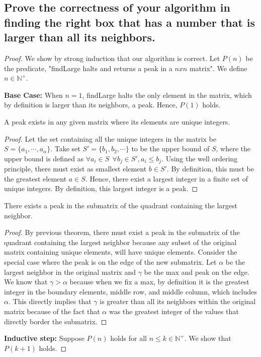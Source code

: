 \documentclass[11pt]{scrartcl}
\begin{document}
\subsection{
	Prove the correctness of your algorithm in finding the right box that has a number
	that is larger than all its neighbors.
}
\begin{proof}
	We show by strong induction that our algorithm is correct. Let $P(n)$ be the predicate,
	"findLarge halts and returns a peak in a $nxn$ matrix".
	We define $n \in \mathbb{N^{+}}$.
	\par \textbf{Base Case:} When $n = 1$, findLarge halts the only element in the matrix, which by definition
	is larger than its neighbors, a peak. Hence, $P(1)$ holds.
	\begin{theorem*}
		A peak exists in any given matrix where its elements are unique integers.
		\begin{proof}
			Let the set
			containing all the unique integers in the matrix be $S = \{a_1, \cdots, a_\alpha\}$.
			Take set $S' = \{b_1, b_2, \cdots\}$ to be the upper bound of $S$,
			where the upper bound is defined as $ \forall a_i \in S \ \ \forall b_j \in S', a_i \leq b_j$.
			Using the well ordering principle, there must exist as smallest element $b \in S'$.
			By definition, this must be the greatest element $a \in S$.
			Hence, there exist a largest integer in a finite set of unique integers.
			By definition, this largest integer is a peak.
		\end{proof}
	\end{theorem*}
	\begin{corollary*}
		There exists a peak in the submatrix of the quadrant containing the largest neighbor.
		\begin{proof}
			By previous theorem, there must exist a peak in the submatrix of the quadrant containing the largest neighbor
			because any subset of the original matrix containing unique elements, will have unique elements. Consider the
			special case where the peak is on the edge of the new submatrix. Let $\alpha$ be the largest neighbor in the original
			matrix and $\gamma$ be the max and peak on the edge. We know that $\gamma > \alpha$ because when we fix a max,
			by definition it is the
			greatest integer in the boundary elements, middle row, and middle column, which includes
			$\alpha$. This directly implies that $\gamma$
			is greater than all its neighbors within the original matrix because of the fact that $\alpha$ was the
			greatest integer of the values that directly border the submatrix.
		\end{proof}
	\end{corollary*}
	\par \textbf{Inductive step:} Suppose $P(n)$ holds for all $n \leq k \in \mathbb{N}^{+}$. We show that $P(k+1)$ holds.


\end{proof}
\end{document}
